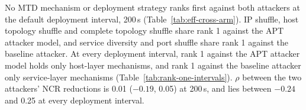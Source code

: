 \documentclass{cshonours}
\newcommand{\prelim}[1]{#1}
\begin{document}
No MTD mechanism or deployment strategy ranks first against both attackers at
the default deployment interval, 200\,s (Table~\ref{tab:eff-cross-arm}). IP
shuffle, host topology shuffle and complete topology shuffle share rank 1
against the APT attacker model, and service diversity and port shuffle share
rank 1 against the baseline attacker. At every deployment interval, rank 1
against the APT attacker model holds only host-layer mechanisms, and rank 1
against the baseline attacker only service-layer mechanisms
(Table~\ref{tab:rank-one-intervals}). $\rho$ between the two attackers' NCR
reductions is \prelim{0.01} (\prelim{$-0.19$}, \prelim{0.05}) at 200\,s, and lies
between \prelim{$-0.24$} and \prelim{0.25} at every deployment interval.
\end{document}
